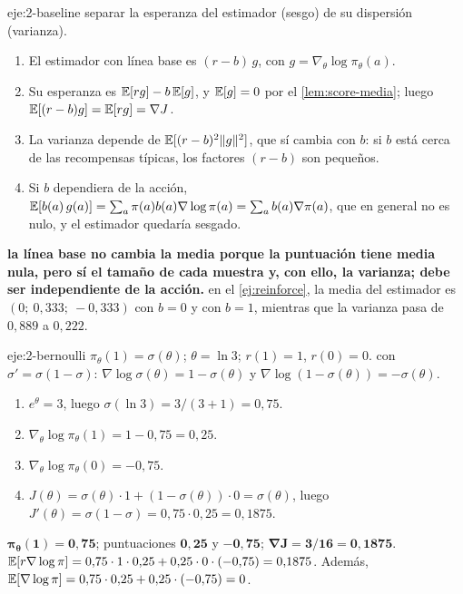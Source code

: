 \begin{solucion}{eje:2-baseline}
\planteamiento separar la esperanza del estimador (sesgo) de su dispersión (varianza).
\pasos
\begin{enumerate}[label=\arabic*.]
  \item El estimador con línea base es $(r-b)\,g$, con $g=\nabla_\theta\log\pi_\theta(a)$.
  \item Su esperanza es $\mathbb{E}[rg]-b\,\mathbb{E}[g]$, y $\mathbb{E}[g]=0$ por el \cref{lem:score-media}; luego $\mathbb{E}[(r-b)g]=\mathbb{E}[rg]=\nabla J$.
  \item La varianza depende de $\mathbb{E}[(r-b)^{2}\lVert g\rVert^{2}]$, que sí cambia con $b$: si $b$ está cerca de las recompensas típicas, los factores $(r-b)$ son pequeños.
  \item Si $b$ dependiera de la acción, $\mathbb{E}[b(a)\,g(a)]=\sum_a\pi(a)b(a)\nabla\log\pi(a)=\sum_a b(a)\nabla\pi(a)$, que en general no es nulo, y el estimador quedaría sesgado.
\end{enumerate}
\resultado \textbf{la línea base no cambia la media porque la puntuación tiene media nula, pero sí el tamaño de cada muestra y, con ello, la varianza; debe ser independiente de la acción.}
\comprobacion en el \cref{ej:reinforce}, la media del estimador es $(0;\ 0{,}333;\ -0{,}333)$ con $b=0$ y con $b=1$, mientras que la varianza pasa de $0{,}889$ a $0{,}222$.
\end{solucion}

\begin{solucion}{eje:2-bernoulli}
\datos $\pi_\theta(1)=\sigma(\theta)$; $\theta=\ln 3$; $r(1)=1$, $r(0)=0$.
\planteamiento con $\sigma'=\sigma(1-\sigma)$: $\nabla\log\sigma(\theta)=1-\sigma(\theta)$ y $\nabla\log(1-\sigma(\theta))=-\sigma(\theta)$.
\pasos
\begin{enumerate}[label=\arabic*.]
  \item $e^{\theta}=3$, luego $\sigma(\ln 3)=3/(3+1)=0{,}75$.
  \item $\nabla_\theta\log\pi_\theta(1)=1-0{,}75=0{,}25$.
  \item $\nabla_\theta\log\pi_\theta(0)=-0{,}75$.
  \item $J(\theta)=\sigma(\theta)\cdot 1+(1-\sigma(\theta))\cdot 0=\sigma(\theta)$, luego $J'(\theta)=\sigma(1-\sigma)=0{,}75\cdot 0{,}25=0{,}1875$.
\end{enumerate}
\resultado $\mathbf{\pi_\theta(1)=0{,}75}$; puntuaciones $\mathbf{0{,}25}$ y $\mathbf{-0{,}75}$; $\mathbf{\nabla J=3/16=0{,}1875}$.
\comprobacion $\mathbb{E}[r\nabla\log\pi]=0{,}75\cdot 1\cdot 0{,}25+0{,}25\cdot 0\cdot(-0{,}75)=0{,}1875$. Además, $\mathbb{E}[\nabla\log\pi]=0{,}75\cdot 0{,}25+0{,}25\cdot(-0{,}75)=0$.
\end{solucion}

